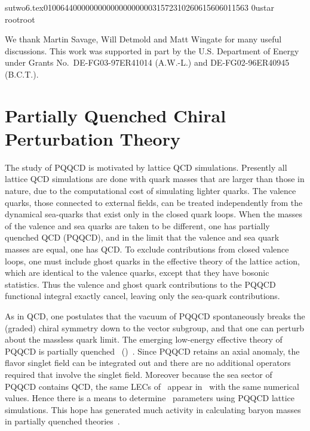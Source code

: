                                                                                                                                                                                                                                                                                       sutwo6.tex                                                                                          0100644 0000000 0000000 00000315723 10260615606 011563  0                                                                                                    ustar   root                            root                                                                                                                                                                                                                   \documentclass[prd,amssymb,amsmath,showpacs,nofootinbib,superscriptaddress]{revtex4}
\begin{document}
\begin{acknowledgments}
We thank Martin Savage, Will Detmold and Matt Wingate for many useful
discussions.  This work was supported in part by the U.S. Department of
Energy under Grants No.~DE-FG03-97ER41014 (A.W.-L.) and
DE-FG02-96ER40945 (B.C.T.).
\end{acknowledgments}



\appendix

%
%
%
%
%
%
%
%
%
%
%
%
\section{Partially Quenched Chiral Perturbation Theory}\label{ap:PQCPT}
The study of PQQCD is motivated by lattice QCD simulations.  Presently
all lattice QCD simulations are done with quark masses that are
larger than those in nature, due to the computational cost of
simulating lighter quarks.  The valence quarks, those connected to
external fields, can be treated independently from the dynamical
sea-quarks that exist only in the closed quark
loops.  When the masses of the valence and sea quarks are taken to be
different, one has partially quenched QCD (PQQCD), and in the limit
that the valence and sea 
quark masses are equal, one has QCD.  To exclude contributions from
closed valence loops, one must include ghost quarks in the
effective theory of the lattice action,
which are identical to the valence
quarks, except that they have bosonic statistics.  Thus the valence
and ghost quark contributions to the PQQCD functional integral exactly
cancel, leaving only the sea-quark contributions.

As in QCD, one postulates that the vacuum of PQQCD spontaneously
breaks the (graded) chiral symmetry down to the vector subgroup,
and that one can perturb about the massless quark limit.  The emerging
low-energy effective theory of PQQCD is partially quenched \CPT\
(\PQCPT)~\cite{Bernard:1993sv,Sharpe:1997by,Golterman:1997st, 
  Sharpe:2000bc,Sharpe:2001fh,Sharpe:2003vy}.  Since PQQCD retains an
axial anomaly, the flavor singlet field can be integrated out and
there are no additional operators required that involve the singlet
field.  Moreover because the sea sector of PQQCD contains QCD, the
same LECs of \CPT\ appear in \PQCPT\ with the same numerical values.
Hence there is a means to determine \CPT\ parameters using PQQCD
lattice simulations. This hope has generated much activity in
calculating baryon masses in partially quenched
theories~\cite{Chen:2001yi,Beane:2002vq,Walker-Loud:2004hf,
  Tiburzi:2004rh,Tiburzi:2004kd}.
\end{document}
